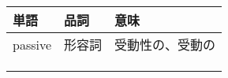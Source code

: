 \begin{table}[]
  \begin{tabular}{l|ll}
    単語      & 品詞　   & 意味 \\ \hline

    passive  & 形容詞   & 受動性の、受動の   \\ 
             &         &    \\
             &    &    \\ \hline
             &    &   
  \end{tabular}
  \end{table}